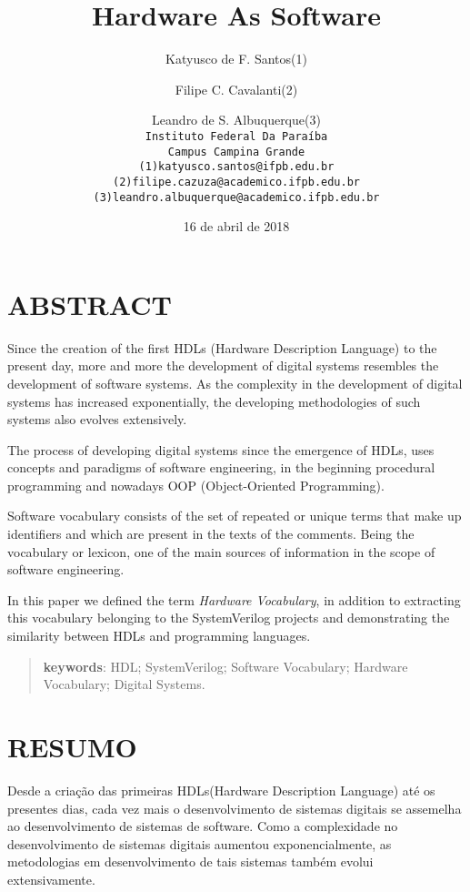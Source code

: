 \documentclass[12pt, twocolumn, a4paper]{article}
\begin{document}
	\title{Hardware As Software}
	\author{Katyusco de F. Santos(1)\\
	\and
	Filipe C. Cavalanti(2)\\
	\and
	Leandro de S. Albuquerque(3)\\
	\texttt{Instituto Federal Da Paraíba}\\
	\texttt{Campus Campina Grande}\\
	\texttt{(1)katyusco.santos@ifpb.edu.br}\\
	\texttt{(2)filipe.cazuza@academico.ifpb.edu.br}\\
	\texttt{(3)leandro.albuquerque@academico.ifpb.edu.br}}
	\date{16 de abril de 2018}
	\maketitle
	
	\section{ABSTRACT}
	\quad Since the creation of the first HDLs (Hardware Description Language) to the present day, more and more the development of digital systems resembles the development of software systems. As the complexity in the development of digital systems has increased exponentially, the developing methodologies of such systems also evolves extensively.
	
The process of developing digital systems since the emergence of HDLs, uses concepts and paradigms of software engineering, in the beginning procedural programming and nowadays OOP (Object-Oriented Programming).

Software vocabulary consists of the set of repeated or unique terms that make up identifiers and which are present in the texts of the comments. Being the vocabulary or lexicon, one of the main sources of information in the scope of software engineering.

In this paper we defined the term \textit{Hardware Vocabulary}, in addition to extracting this vocabulary belonging to the SystemVerilog projects and demonstrating the similarity between HDLs and programming languages.
\begin{quote}
\textbf{keywords}: HDL; SystemVerilog; Software Vocabulary; Hardware Vocabulary; Digital Systems.
\end{quote}

	\section{RESUMO}
	\quad Desde a criação das primeiras HDLs(Hardware Description Language) até os presentes dias, cada vez mais o desenvolvimento de sistemas digitais se assemelha ao desenvolvimento de sistemas de software. Como a complexidade no desenvolvimento de sistemas digitais aumentou exponencialmente, as metodologias em desenvolvimento de tais sistemas também evolui extensivamente. %
\end{document}
